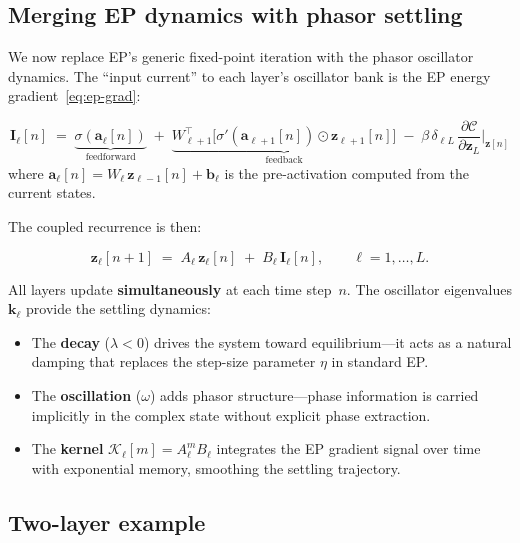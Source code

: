 \documentclass[11pt]{article}
\theoremstyle{definition}
\begin{document}
\subsection{Merging EP dynamics with phasor settling}

We now replace EP's generic fixed-point iteration with the phasor
oscillator dynamics.  The ``input current'' to each layer's oscillator
bank is the EP energy gradient~\eqref{eq:ep-grad}:

\begin{equation}\label{eq:coupled-drive}
  \bm{I}_\ell[n]
  \;=\;
  \underbrace{\sigma(\bm{a}_\ell[n])}_{\text{feedforward}}
  \;+\;
  \underbrace{
    W_{\ell+1}^{\!\top}
    \bigl[\sigma'(\bm{a}_{\ell+1}[n])\odot\bm{z}_{\ell+1}[n]\bigr]
  }_{\text{feedback}}
  \;-\;
  \beta\,\delta_{\ell L}\,
  \frac{\partial\mathcal{C}}{\partial\bm{z}_L}\bigg|_{\bm{z}[n]}
\end{equation}
where $\bm{a}_\ell[n]=W_\ell\,\bm{z}_{\ell-1}[n]+\bm{b}_\ell$ is
the pre-activation computed from the current states.

The coupled recurrence is then:

\begin{equation}\label{eq:coupled}
  \boxed{
  \bm{z}_\ell[n+1]
  \;=\;
  A_\ell\,\bm{z}_\ell[n]
  \;+\;
  B_\ell\,\bm{I}_\ell[n],
  \qquad \ell=1,\dots,L.
  }
\end{equation}

All layers update \textbf{simultaneously} at each time step~$n$.
The oscillator eigenvalues $\bm{k}_\ell$ provide the
settling dynamics:
\begin{itemize}
\item The \textbf{decay} ($\lambda<0$) drives the system toward
  equilibrium---it acts as a natural damping that replaces the step-size
  parameter $\eta$ in standard EP.
\item The \textbf{oscillation} ($\omega$) adds phasor structure---phase
  information is carried implicitly in the complex state without
  explicit phase extraction.
\item The \textbf{kernel} $\mathcal{K}_\ell[m]=A_\ell^m B_\ell$
  integrates the EP gradient signal over time with exponential memory,
  smoothing the settling trajectory.
\end{itemize}

\subsection{Two-layer example}
\end{document}

